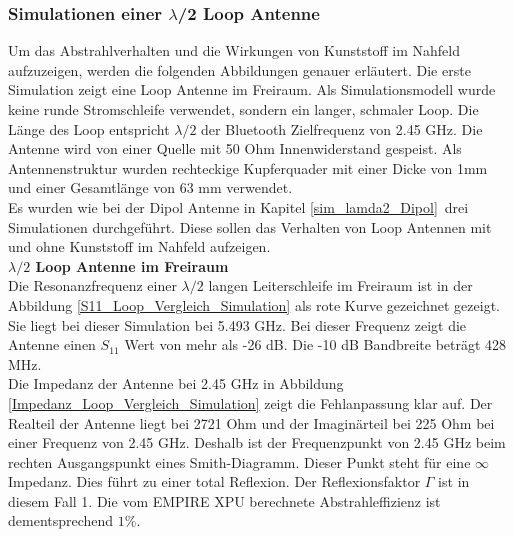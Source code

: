 \subsubsection{Simulationen einer $\lambda$/2 Loop Antenne}\label{sec:SimL2Loop}
Um das Abstrahlverhalten und die Wirkungen von Kunststoff im Nahfeld aufzuzeigen, werden die folgenden Abbildungen genauer erläutert.
Die erste Simulation zeigt eine Loop Antenne im Freiraum. Als Simulationsmodell wurde keine runde Stromschleife verwendet, sondern ein langer, schmaler Loop. Die Länge des Loop entspricht $\lambda/2$ der Bluetooth Zielfrequenz von 2.45 GHz. Die Antenne wird von einer Quelle mit 50 Ohm Innenwiderstand gespeist. Als Antennenstruktur wurden rechteckige Kupferquader mit einer Dicke von 1mm  und einer Gesamtlänge von 63 mm verwendet.\\

Es wurden wie bei der Dipol Antenne in Kapitel \ref{sim_lamda2_Dipol}\ drei Simulationen durchgeführt. Diese sollen das Verhalten von Loop Antennen mit und ohne Kunststoff im Nahfeld aufzeigen.\\ 

\textbf{$\lambda/2$ Loop Antenne im Freiraum}\\
Die Resonanzfrequenz einer $\lambda/2$ langen Leiterschleife im Freiraum ist in der Abbildung \ref{S11_Loop_Vergleich_Simulation} als rote Kurve gezeichnet gezeigt. Sie liegt bei dieser Simulation bei 5.493 GHz. Bei dieser Frequenz zeigt die Antenne einen $S_{11}$ Wert von mehr als -26 dB. Die -10 dB Bandbreite beträgt 428 MHz.\\
Die Impedanz der Antenne bei 2.45 GHz in Abbildung \ref{Impedanz_Loop_Vergleich_Simulation} zeigt die Fehlanpassung klar auf. Der Realteil der Antenne liegt bei 2721 Ohm und der Imaginärteil bei 225 Ohm bei einer Frequenz von 2.45 GHz. Deshalb ist der Frequenzpunkt von 2.45 GHz beim rechten Ausgangspunkt eines Smith-Diagramm. Dieser Punkt steht für eine $\infty$ Impedanz. Dies führt zu einer total Reflexion. Der Reflexionsfaktor $\Gamma$ ist in diesem Fall 1. Die vom EMPIRE XPU berechnete Abstrahleffizienz ist dementsprechend $1\%$.\\


